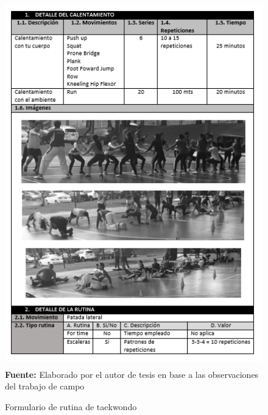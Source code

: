 \begin{figure}[H]
	\caption{Formulario de rutina de taekwondo}
	\label{fig:frmRoutTaek}
	\centering	\includegraphics[width=445px,height=600px]{graphics/resultados/rutina-taekwondo.PNG} \\
	\textbf{Fuente:} Elaborado por el autor de tesis en base a las observaciones del trabajo de campo
\end{figure}
